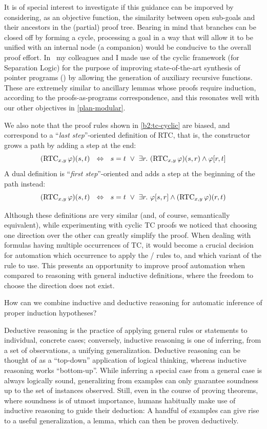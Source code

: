 It is of special interest to investigate if this guidance can be imporved by considering, as an objective function, the similarity between open sub-goals and their ancestors in the (partial) proof tree.
Bearing in mind that branches can be closed off by forming a cycle, processing a goal in a way that will allow it to be unified with an internal node (a companion) would be conducive to the overall proof effort.
In~\cite{PLDI2021:Itzhaky} my colleagues and I made use of the cyclic framework (for Separation Logic) for the purpose of improving state-of-the-art synthesis of pointer programs (\cite{POPL2019:Polikarpova}) by allowing the generation of auxiliary recursive functions.
These are extremely similar to ancillary lemmas whose proofs require induction, according to the proofs-as-programs correspondence, and this resonates well with our other objectives in \autoref{plan-modular}.

We also note that the proof rules shown in \autoref{b2:tc-cyclic} are biased, and correspond to a ``\emph{last step}''-oriented definition of RTC,
that is, the constructor grows a path by adding a step at the end:
%
\[(\mathrm{RTC}_{x,y}\,\varphi)(s,t) ~~\Leftrightarrow~~
  s = t ~\lor~ \exists r.~(\mathrm{RTC}_{x,y}\,\varphi)(s,r) \land \varphi[r,t]
\]
%
A dual definition is ``\emph{first step}''-oriented and adds a step at the beginning of the path instead:
%
\[(\mathrm{RTC}_{x,y}\,\varphi)(s,t) ~~\Leftrightarrow~~
  s = t ~\lor~ \exists r.~\varphi[s,r] \land (\mathrm{RTC}_{x,y}\,\varphi)(r,t)
\]

Although these definitions are very similar (and, of course, semantically equivalent), while experimenting with cyclic TC proofs we noticed that choosing one direction over the other can greatly simplify the proof.
When dealing with formulas having multiple occurrences of TC, it would become a crucial decision for automation which occurrence to apply the / rules to, and which variant of the rule to use.
This presents an opportunity to improve proof automation when compared to reasoning with general inductive definitions, where the freedom to choose the direction does not exist.

\begin{researchquestion}How can we combine inductive and deductive reasoning for automatic inference of proper induction hypotheses?
\end{researchquestion}

Deductive reasoning is the practice of applying general rules or statements to
individual, concrete cases; conversely, inductive reasoning is one of inferring,
from a set of observations, a unifying generalization.
Deductive reasoning can be thought of as a ``top-down'' application of logical
thinking, whereas inductive reasoning works ``bottom-up''.
While inferring a special case from a general case is always logically sound,
generalizing from examples can only guarantee soundness up to the set of
instances observed.
Still, even in the course of proving theorems, where soundness is of utmost
importance, humans habitually make use of inductive reasoning to guide their
deduction:
A handful of examples can give rise to a useful generalization, a lemma,
which can then be proven deductively.

